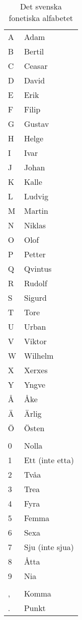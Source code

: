 \begin{table}[htbp]
  \label{tab:bokstavering-svenska}
  \caption{Det svenska fonetiska alfabetet}
  \begin{tabular}{ll}
    A & Adam \\
    B & Bertil \\
    C & Ceasar \\
    D & David \\
    E & Erik \\
    F & Filip \\
    G & Gustav \\
    H & Helge \\
    I & Ivar \\
    J & Johan \\
    K & Kalle \\
    L & Ludvig \\
    M & Martin \\
    N & Niklas \\
    O & Olof \\
    P & Petter \\
    Q & Qvintus \\
    R & Rudolf \\
    S & Sigurd \\
    T & Tore \\
    U & Urban \\
    V & Viktor \\
    W & Wilhelm \\
    X & Xerxes \\
    Y & Yngve \\
    Å & Åke \\
    Ä & Ärlig \\
    Ö & Östen \\
    & \\
    0 & Nolla \\
    1 & Ett (inte etta) \\
    2 & Tvåa \\
    3 & Trea \\
    4 & Fyra \\
    5 & Femma \\
    6 & Sexa \\
    7 & Sju (inte sjua) \\
    8 & Åtta \\
    9 & Nia \\
    & \\
    , & Komma \\
    . & Punkt
  \end{tabular}
\end{table}
